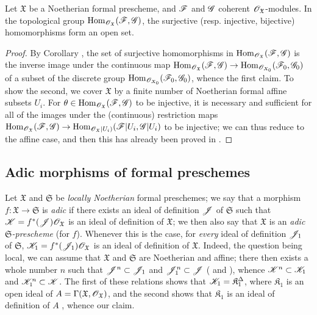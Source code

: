 \begin{proposition}[10.11.9]
\label{I.10.11.9}
Let $\mathfrak{X}$ be a Noetherian formal prescheme, and $\mathscr{F}$ and $\mathscr{G}$ coherent $\mathscr{O}_\mathfrak{X}$-modules.
In the topological group $\operatorname{Hom}_{\mathscr{O}_\mathfrak{X}}(\mathscr{F},\mathscr{G})$, the surjective (resp. injective, bijective) homomorphisms form an open set.
\end{proposition}

\begin{proof}
By Corollary , the set of surjective homomorphisms in $\operatorname{Hom}_{\mathscr{O}_\mathfrak{X}}(\mathscr{F},\mathscr{G})$ is the inverse image under the continuous map $\Hom_{\sh{O}_\mathfrak{X}}(\sh{F},\sh{G})\to\Hom_{\sh{O}_{X_0}}(\sh{F}_0,\sh{G}_0)$ of a subset of the discrete group $\operatorname{Hom}_{\mathscr{O}_{X_0}}(\mathscr{F}_0,\mathscr{G}_0)$, whence the first claim.
To show the second, we cover $\mathfrak{X}$ by a finite number of Noetherian formal affine subsets $U_i$.
For $\theta\in\operatorname{Hom}_{\mathscr{O}_\mathfrak{X}}(\mathscr{F},\mathscr{G})$ to be injective, it is necessary and sufficient for all of the images under the (continuous) restriction maps $\Hom_{\sh{O}_\mathfrak{X}}(\sh{F},\sh{G})\to\Hom_{\sh{O}_\mathfrak{X}|U_i)}(\sh{F}|U_i,\sh{G}|U_i)$ to be injective; we can thus reduce to the affine case, and then this has already been proved in .
\end{proof}

\subsection{Adic morphisms of formal preschemes}
\label{subsection:I.10.12}

\begin{env}[10.12.1]
\label{I.10.12.1}
Let $\mathfrak{X}$ and $\mathfrak{S}$ be \emph{locally Noetherian} formal preschemes;
we say that a morphism $f:\mathfrak{X}\to\mathfrak{S}$ is \emph{adic} if there exists an ideal of definition $\mathscr{J}$ of $\mathfrak{S}$ such that $\mathscr{K}=f^*(\mathscr{J})\mathscr{O}_\mathfrak{X}$ is an ideal of definition of $\mathfrak{X}$;
we then also say that $\mathfrak{X}$ is an \emph{adic $\mathfrak{S}$-prescheme} (for $f$).
Whenever this is the case, for \emph{every} ideal of definition $\mathscr{J}_1$ of $\mathfrak{S}$, $\mathscr{K}_1=f^*(\mathscr{J}_1)\mathscr{O}_\mathfrak{X}$ is an ideal of definition of $\mathfrak{X}$.
Indeed, the question being local, we can assume that $\mathfrak{X}$ and $\mathfrak{S}$ are Noetherian and affine;
there then exists a whole number $n$ such that $\mathscr{J}^n\subset\mathscr{J}_1$ and $\mathscr{J}_1^n\subset\mathscr{J}$ ( and ), whence $\mathscr{K}^n\subset\mathscr{K}_1$ and $\mathscr{K}_1^n\subset\mathscr{K}$.
The first of these relations shows that $\mathscr{K}_1=\mathfrak{K}_1^\Delta$, where $\mathfrak{K}_1$ is an open ideal of $A=\Gamma(\mathfrak{X},\mathscr{O}_\mathfrak{X})$, and the second shows that $\mathfrak{K}_1$ is an ideal of definition of $A$ , whence our claim.
\end{env}

